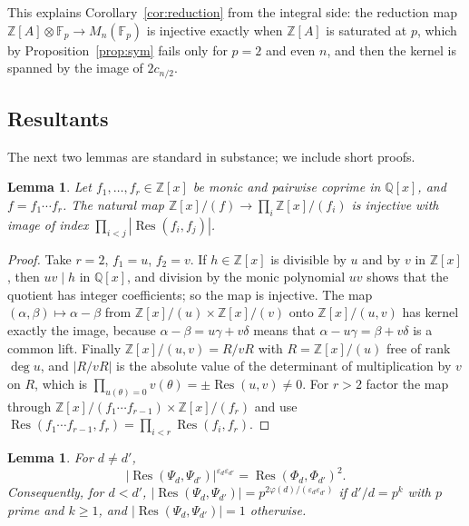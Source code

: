 \documentclass[11pt]{amsart}
\newtheorem{lemma}[theorem]{Lemma}
\theoremstyle{definition}
\theoremstyle{remark}
\numberwithin{equation}{section}
\newcommand{\Q}{\mathbb{Q}}
\newcommand{\Z}{\mathbb{Z}}
\newcommand{\F}{\mathbb{F}}
\newcommand{\Res}{\operatorname{Res}}
\begin{document}
This explains Corollary~\ref{cor:reduction} from the integral side: the reduction map $\Z[A]\otimes\F_p\to M_n(\F_p)$ is injective exactly when $\Z[A]$ is saturated at $p$, which by Proposition~\ref{prop:sym} fails only for $p=2$ and even $n$, and then the kernel is spanned by the image of $2c_{n/2}$.

\subsection{Resultants} The next two lemmas are standard in substance; we include short proofs.

\begin{lemma}\label{lem:index}
Let $f_1,\dots,f_r\in\Z[x]$ be monic and pairwise coprime in $\Q[x]$, and $f=f_1\cdots f_r$. The natural map $\Z[x]/(f)\to\prod_i\Z[x]/(f_i)$ is injective with image of index $\prod_{i<j}|\Res(f_i,f_j)|$.
\end{lemma}

\begin{proof}
Take $r=2$, $f_1=u$, $f_2=v$. If $h\in\Z[x]$ is divisible by $u$ and by $v$ in $\Z[x]$, then $uv\mid h$ in $\Q[x]$, and division by the monic polynomial $uv$ shows that the quotient has integer coefficients; so the map is injective. The map $(\alpha,\beta)\mapsto\alpha-\beta$ from $\Z[x]/(u)\times\Z[x]/(v)$ onto $\Z[x]/(u,v)$ has kernel exactly the image, because $\alpha-\beta=u\gamma+v\delta$ means that $\alpha-u\gamma=\beta+v\delta$ is a common lift. Finally $\Z[x]/(u,v)=R/vR$ with $R=\Z[x]/(u)$ free of rank $\deg u$, and $|R/vR|$ is the absolute value of the determinant of multiplication by $v$ on $R$, which is $\prod_{u(\theta)=0}v(\theta)=\pm\Res(u,v)\ne0$. For $r>2$ factor the map through $\Z[x]/(f_1\cdots f_{r-1})\times\Z[x]/(f_r)$ and use $\Res(f_1\cdots f_{r-1},f_r)=\prod_{i<r}\Res(f_i,f_r)$.
\end{proof}

\begin{lemma}\label{lem:res}
For $d\ne d'$,
\[
|\Res(\Psi_d,\Psi_{d'})|^{\varepsilon_d\varepsilon_{d'}}=\Res(\Phi_d,\Phi_{d'})^2 .
\]
Consequently, for $d<d'$, $|\Res(\Psi_d,\Psi_{d'})|=p^{2\varphi(d)/(\varepsilon_d\varepsilon_{d'})}$ if $d'/d=p^k$ with $p$ prime and $k\ge1$, and $|\Res(\Psi_d,\Psi_{d'})|=1$ otherwise.
\end{lemma}
\end{document}
